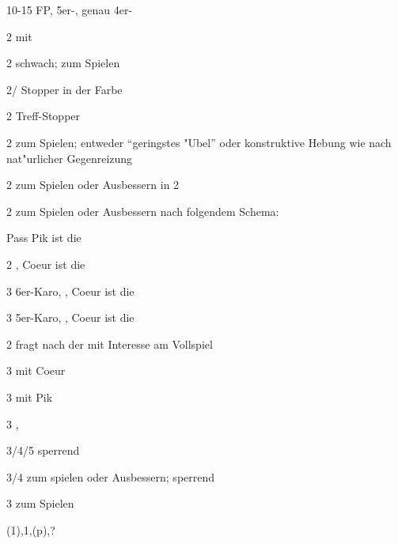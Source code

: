 \begin{appendix}
		10-15 FP, 5\pl{}er-\ka, genau 4er-\ofa
		\bdsc
			\item[2\tre] \inv{}\pl mit \ka
				\bdsc
					\item[2\kar] schwach; zum Spielen
					\item[2\coe/\pi] Stopper in der Farbe
					\item[2\SA] Treff-Stopper
				\edsc
			\item[2\kar] zum Spielen; entweder "`geringstes "Ubel"' oder
				konstruktive Hebung wie nach nat"urlicher Gegenreizung
			\item[2\coe] zum Spielen oder Ausbessern in 2\pik
			\item[2\pik] zum Spielen oder Ausbessern nach folgendem Schema:
				\bdsc
					\item[Pass] Pik ist die \ofa
					\item[2\nt] \maxi, Coeur ist die \ofa
					\item[3\kar] 6\pl{}er-Karo, \mini, Coeur ist die \ofa
					\item[3\coe] 5er-Karo, \mini, Coeur ist die \ofa
				\edsc
			\item[2\SA] fragt nach der \ofa mit Interesse am Vollspiel
				\bdsc
					\item[3\tre] \maxi mit Coeur
					\item[3\kar] \maxi mit Pik
					\item[3\of] \nat, \mini
				\edsc
			\item[3\kar/4\kar/5\kar] sperrend
			\item[3\of/4\of] zum spielen oder Ausbessern; sperrend
			\item[3\SA] zum Spielen
			
		\edsc
	\item[(1\coe)\sep{}1\SA{}\sep{}(p)\sep{}?]~


\end{appendix}
